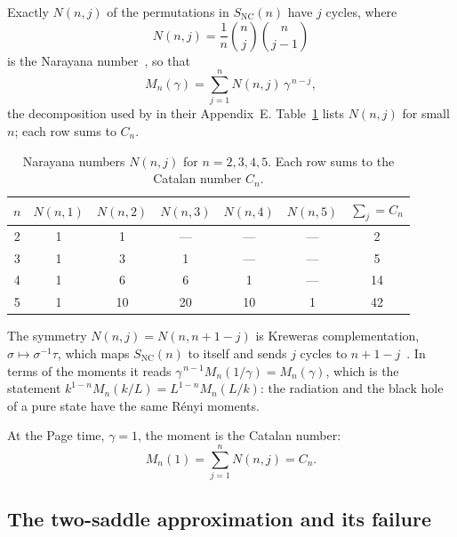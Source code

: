 \documentclass[11pt,letterpaper]{article}
\theoremstyle{plain}
\theoremstyle{definition}
\theoremstyle{remark}
\begin{document}
Exactly $N(n,j)$ of the permutations in $S_{\mathrm{NC}}(n)$ have $j$ cycles, where
\begin{equation}
\label{eq02:narayana_def}
N(n,j) = \frac{1}{n} \binom{n}{j} \binom{n}{j-1}
\end{equation}
is the Narayana number~\citep{nicaspeicher2006}, so that
\begin{equation}
\label{eq02:moment_narayana}
M_n(\gamma) = \sum_{j=1}^{n} N(n,j) \, \gamma^{\,n-j} ,
\end{equation}
the decomposition used by \citet{pssyetal2022} in their Appendix~E. Table~\ref{tab02:narayana} lists $N(n,j)$ for small $n$; each row sums to $C_n$.

\begin{table}[htbp]
\centering
\caption{Narayana numbers $N(n,j)$ for $n = 2, 3, 4, 5$. Each row sums to the Catalan number $C_n$.}
\label{tab02:narayana}
\begin{tabular}{c|ccccc|c}
\hline
$n$ & $N(n,1)$ & $N(n,2)$ & $N(n,3)$ & $N(n,4)$ & $N(n,5)$ & $\sum_j = C_n$ \\
\hline
2 & 1 & 1 & --- & --- & --- & 2 \\
3 & 1 & 3 & 1 & --- & --- & 5 \\
4 & 1 & 6 & 6 & 1 & --- & 14 \\
5 & 1 & 10 & 20 & 10 & 1 & 42 \\
\hline
\end{tabular}
\end{table}

The symmetry $N(n,j) = N(n, n+1-j)$ is Kreweras complementation, $\sigma \mapsto \sigma^{-1}\tau$, which maps $S_{\mathrm{NC}}(n)$ to itself and sends $j$ cycles to $n+1-j$~\citep{nicaspeicher2006}. In terms of the moments it reads $\gamma^{\,n-1} M_n(1/\gamma) = M_n(\gamma)$, which is the statement $k^{1-n}M_n(k/L) = L^{1-n}M_n(L/k)$: the radiation and the black hole of a pure state have the same R\'enyi moments.

At the Page time, $\gamma = 1$, the moment is the Catalan number:
\begin{equation}
\label{eq02:moment_page_time}
M_n(1) = \sum_{j=1}^{n} N(n,j) = C_n .
\end{equation}

\subsection{The two-saddle approximation and its failure}
\label{subsec02:two_saddle}
\end{document}
